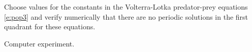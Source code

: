 \documentclass{ximera}
\begin{document}
\begin{exercise} \label{c9.1.4}
Choose values for the constants in the Volterra-Lotka predator-prey equations 
\eqref{e:pop3} and verify numerically that there are no periodic solutions in 
the first quadrant for these equations.

\begin{solution}
Computer experiment.

\end{solution}
\end{exercise}
\end{document}
